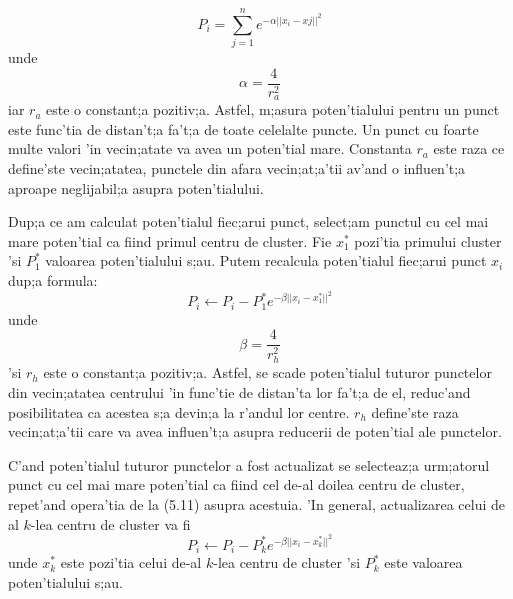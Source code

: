 \begin{equation}
P_{i} = \displaystyle \sum_{j=1}^{n} e^{-\alpha||x_{i} - x{j}||^{2}}
\end{equation}
unde
\begin{equation}
\alpha = \frac {4} {r_{a}^{2}}
\end{equation}
iar $r_{a}$ este o constant;a pozitiv;a. Astfel, m;asura poten'tialului pentru un punct este func'tia de distan't;a fa't;a de toate celelalte puncte. Un punct cu foarte multe valori 'in vecin;atate va avea un poten'tial mare. Constanta $r_{a}$ este raza ce define'ste vecin;atatea, punctele din afara vecin;at;a'tii av'and o influen't;a aproape neglijabil;a asupra poten'tialului.
\par
Dup;a ce am calculat poten'tialul fiec;arui punct, select;am punctul cu cel mai mare poten'tial ca fiind primul centru de cluster. Fie $x_{1}^{*}$ pozi'tia primului cluster 'si $P_{1}^{*}$ valoarea poten'tialului s;au. Putem recalcula poten'tialul fiec;arui punct $x_i$ dup;a formula:
\begin{equation}
P_{i} \leftarrow P_i - P_1^{*}e^{-\beta||x_{i} - x_{1}^{*}||^{2}}
\end{equation}
unde
\begin{equation}
\beta = \frac {4} {r_h^2}
\end{equation}
'si $r_h$ este o constant;a pozitiv;a. Astfel, se scade poten'tialul tuturor punctelor din vecin;atatea centrului 'in func'tie de distan'ta lor fa't;a de el, reduc'and posibilitatea ca acestea s;a devin;a la r'andul lor centre. $r_h$ define'ste raza vecin;at;a'tii care va avea influen't;a asupra reducerii de poten'tial ale punctelor.
\par
C'and poten'tialul tuturor punctelor a fost actualizat se selecteaz;a urm;atorul punct cu cel mai mare poten'tial ca fiind cel de-al doilea centru de cluster, repet'and opera'tia de la (5.11) asupra acestuia. 'In general, actualizarea celui de al $k$-lea centru de cluster va fi
\begin{equation}
P_{i} \leftarrow P_i - P_k^{*}e^{-\beta||x_{i} - x_{k}^{*}||^{2}}
\end{equation}
unde $x_k^*$ este pozi'tia celui de-al $k$-lea centru de cluster 'si $P_k^*$ este valoarea poten'tialului s;au.

